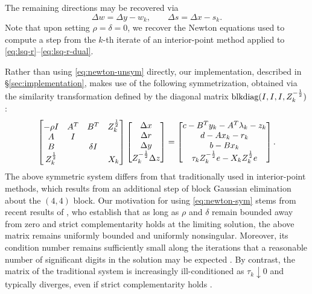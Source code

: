 \documentclass{amsart}
\begin{document}
The remaining directions may be recovered via
\begin{equation}
  \label{eq:other-dirs}
  \Delta w = \Delta y - w_k, \qquad
  \Delta s = \Delta x - s_k.
\end{equation}
Note that upon setting $\rho = \delta = 0$, we recover the Newton equations
used to compute a step from the $k$-th iterate of an interior-point method
applied to \eqref{eq:lsq-r}--\eqref{eq:lsq-r-dual}.

Rather than using \eqref{eq:newton-unsym} directly, our implementation,
described in \S\ref{sec:implementation}, makes use of
the following symmetrization, obtained via the similarity transformation
defined by the diagonal matrix $\mathop{\text{blkdiag}}(I, I, I, Z_k^{-\frac12})$:
\begin{equation}
  \label{eq:newton-sym}
  \begin{bmatrix}
    -\rho I        & A^T & B^T      & Z_k^{\frac12} \\
     A             & I   &          &               \\
     B             &     & \delta I &               \\
     Z_k^{\frac12} &     &          &  X_k
  \end{bmatrix}
  \begin{bmatrix}
    \Delta x \\ \Delta r \\ \Delta y \\ Z_k^{-\frac12} \Delta z
  \end{bmatrix}
  =
  \begin{bmatrix}
    c - B^T y_k - A^T \lambda_k - z_k \\
    d - A x_k - r_k \\
    b - B x_k \\
    \tau_k Z_k^{-\frac12} e - X_k Z_k^{\frac12} e
  \end{bmatrix}.
\end{equation}
The above symmetric system differs from that traditionally used in
interior-point methods, which results from an additional step of block Gaussian
elimination about the $(4,4)$ block. Our motivation for using
\eqref{eq:newton-sym} stems from recent results of
\cite{greif-moulding-orban-2012}, who establish that as long as $\rho$ and
$\delta$ remain bounded away from zero and strict complementarity holds at the
limiting solution, the above  matrix remains uniformly bounded and
uniformly nonsingular. Moreover, its condition number remains sufficiently
small along the iterations that a reasonable number of significant digits in
the solution may be expected \citep[\S4]{greif-moulding-orban-2012}.
By contrast, the  matrix of the traditional system is increasingly
ill-conditioned as $\tau_k \downarrow 0$ and typically diverges, even if strict
complementarity holds \citep[\S3]{greif-moulding-orban-2012}.
\end{document}
